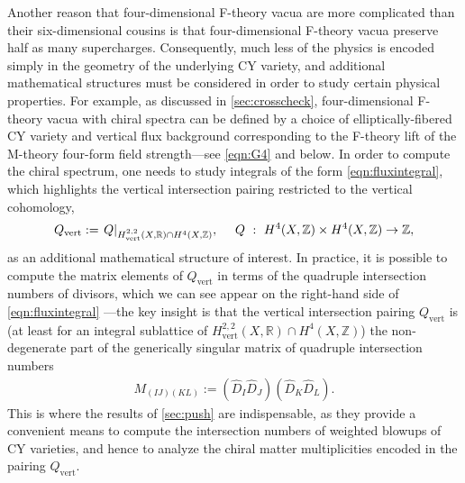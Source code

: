\documentclass[11pt,oneside,english]{article}
\numberwithin{equation}{section}
\let\originalleft\left
\let\originalright\right
\renewcommand*{\left}{\mathopen{}\mathclose\bgroup\originalleft}
\renewcommand*{\right}{\aftergroup\egroup\originalright}
\theoremstyle{definition}
\begin{document}
Another reason that four-dimensional F-theory vacua are more complicated than their six-dimensional cousins is that four-dimensional F-theory vacua preserve half as many supercharges.  Consequently, much less of the physics is encoded simply in the geometry of the underlying CY variety, and additional mathematical structures must be considered in order to study certain physical properties. For example, as discussed in \cref{sec:crosscheck}, four-dimensional F-theory vacua with chiral spectra can be defined by a choice of elliptically-fibered CY variety and vertical flux background corresponding to the F-theory lift of the M-theory four-form field strength---see \cref{eqn:G4} and below. In order to compute the chiral spectrum, one needs to study integrals of the form \cref{eqn:fluxintegral}, which highlights the vertical intersection pairing restricted to the vertical cohomology,
	\begin{align}
		Q_{\text{vert}} := \left. Q \right|_{H^{2,2}_{\text{vert}}(X,\mathbb R) \cap H^4(X,\mathbb Z)},~~~~Q ~:~ H^{4}(X,\mathbb Z) \times H^{4}(X,\mathbb Z) \rightarrow \mathbb Z,
	\end{align}
as an additional mathematical structure of interest. In practice, it is possible to compute the matrix elements of $Q_{\text{vert}}$ in terms of the quadruple intersection numbers of divisors, which we can see appear on the right-hand side of \cref{eqn:fluxintegral} ---the key insight is that the vertical intersection pairing $Q_{\text{vert}}$ is (at least for an integral sublattice of $H^{2,2}_{\text{vert}}(X,\mathbb R) \cap H^4(X,\mathbb Z)$) the non-degenerate part of the generically singular matrix of quadruple intersection numbers \cite{Jefferson:2021bid}
	\begin{align}
	\label{eqn:Mmatrix}
		M_{(IJ)(KL)} := 	(\hat D_I \hat D_J) (\hat D_K \hat D_L).
	\end{align}
This is where the results of \cref{sec:push} are indispensable, as they provide a convenient means to compute the intersection numbers of weighted blowups of CY varieties, and hence to analyze the chiral matter multiplicities encoded in the pairing $Q_{\text{vert}}$. 
\end{document}
